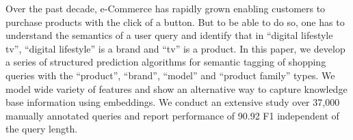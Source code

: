 Over the past decade, e-Commerce has rapidly grown enabling customers to purchase products with the click of a button. But to be able to do so, one has to understand the semantics of a user query and identify that in ``digital lifestyle tv'', ``digital lifestyle'' is a brand and ``tv'' is a product. In this paper, we develop a series of structured prediction algorithms for semantic tagging of shopping queries with the ``product'', ``brand'', ``model'' and ``product family'' types. We model wide variety of features and show an alternative way to capture knowledge base information using embeddings. We conduct an extensive study over 37,000 manually annotated queries and report performance of 90.92 F1 independent of the query length.
